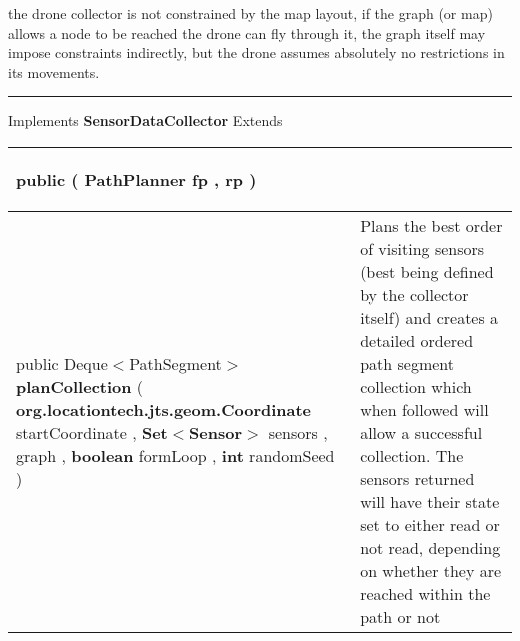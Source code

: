  {\scriptsize the drone collector is not constrained by the map layout, if the graph (or map) allows a node to be reached\newline%
 the drone can fly through it, the graph itself may impose constraints indirectly, but the drone assumes absolutely no restrictions in its movements.
 
\vspace*{4pt} \hrule \vspace*{3pt}
Implements \textbf{ SensorDataCollector }
Extends \textbf{ \hyperref[tab:BaseDataCollector]{\color{blue}{BaseDataCollector}} }
\vspace*{-5pt} 
\begin{tabularx}{\linewidth}{m{}|m{}}
\label{tab:Drone}
\begin{raggedleft}public  \textbf{\hyperref[tab:Drone]{\color{blue}{Drone}} }(\newline \hfill 
\hspace*{ 5pt} \textbf{PathPlanner} fp , \newline
 \hspace*{ 5pt} \textbf{\hyperref[tab:BaseCollectionOrderPlanner]{\color{blue}{BaseCollectionOrderPlanner}}} rp  )
\end{raggedleft} &
 \\ \hline 
\begin{raggedleft}public Deque$<$PathSegment$>$ \textbf{planCollection }(\newline \hfill 
\hspace*{ 5pt} \textbf{org.locationtech.jts.geom.Coordinate} startCoordinate , \newline
 \hspace*{ 5pt} \textbf{Set$<$Sensor$>$} sensors , \newline
 \hspace*{ 5pt} \textbf{\hyperref[tab:ConstrainedTreeGraph]{\color{blue}{ConstrainedTreeGraph}}} graph , \newline
 \hspace*{ 5pt} \textbf{boolean} formLoop , \newline
 \hspace*{ 5pt} \textbf{int} randomSeed  )
\end{raggedleft} &
 Plans the best order of visiting sensors (best being defined by the collector itself)\newline%
 and creates a detailed ordered path segment collection which when followed will allow a successful collection. \newline%
 The sensors returned will have their state set to either\newline%
 read or not read, depending on whether they are reached within the path or not\\\end{tabularx}
}
